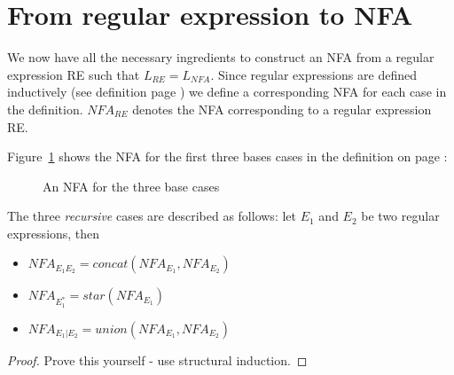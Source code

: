 \clearpage

\section{From regular expression to NFA}\label{re2fsasec}

We now have all the necessary ingredients to construct an NFA from a regular
expression RE such that $L_{RE} = L_{NFA}$. Since regular
expressions are defined inductively (see definition page
\pageref{defregexp}) we define a corresponding NFA for each case in the
definition. $NFA_{RE}$ denotes the NFA corresponding to a
regular expression RE.

Figure~\ref{re2fsa} shows the NFA for the first three bases cases in
the definition on page \pageref{defregexp}:

\begin{figure}[h]
\caption{An NFA for the three base cases\label{re2fsa}}
\end{figure}

The three {\em recursive} cases are described as follows: let $E_1$
and $E_2$ be two regular expressions, then
\begin{itemize}
\item $NFA_{E_1E_2} = concat(NFA_{E_1},NFA_{E_2})$
\item $NFA_{E_1^*} = star(NFA_{E_1})$
\item $NFA_{E_1|E_2} = union(NFA_{E_1},NFA_{E_2})$
\end{itemize}

\begin{proof}
Prove this yourself - use structural induction.
\end{proof}


